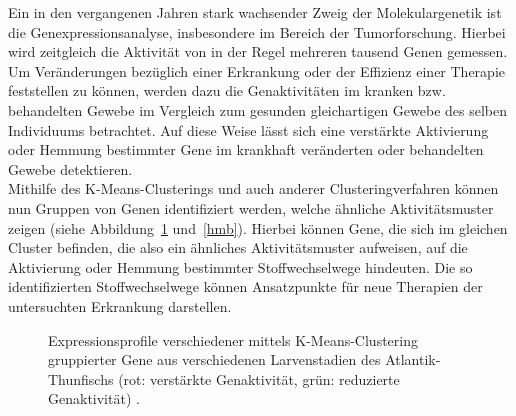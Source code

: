 \documentclass[a4paper,12pt,twoside]{article}
\begin{document}
Ein in den vergangenen Jahren stark wachsender Zweig der Molekulargenetik ist die Genexpressionsanalyse, insbesondere im Bereich der Tumorforschung. Hierbei wird zeitgleich die Aktivität von in der Regel mehreren tausend Genen gemessen. Um Veränderungen bezüglich einer Erkrankung oder der Effizienz einer Therapie feststellen zu können, werden dazu die Genaktivitäten im kranken bzw. behandelten Gewebe im Vergleich zum gesunden gleichartigen Gewebe des selben Individuums betrachtet. Auf diese Weise lässt sich eine verstärkte Aktivierung oder Hemmung bestimmter Gene im krankhaft veränderten oder behandelten Gewebe detektieren. 
\\

Mithilfe des K-Means-Clusterings und auch anderer Clusteringverfahren können nun Gruppen von Genen identifiziert werden, welche ähnliche Aktivitätsmuster zeigen (siehe Abbildung~\ref{hma} und~\ref{hmb}). Hierbei können Gene, die sich im gleichen Cluster befinden, die also ein ähnliches Aktivitätsmuster aufweisen, auf die Aktivierung oder Hemmung bestimmter Stoffwechselwege hindeuten. Die so identifizierten Stoffwechselwege können Ansatzpunkte für neue Therapien der untersuchten Erkrankung darstellen. 


\begin{figure}[!htb]
	\centering
	\null\hfill
	\caption{
		Expressionsprofile verschiedener mittels K-Means-Clustering gruppierter Gene aus verschiedenen Larvenstadien des Atlantik-Thunfischs (rot: verstärkte Genaktivität, grün: reduzierte Genaktivität) \citep{Sarrop2014}.
	}
	\label{hma}
\end{figure}
\end{document}
